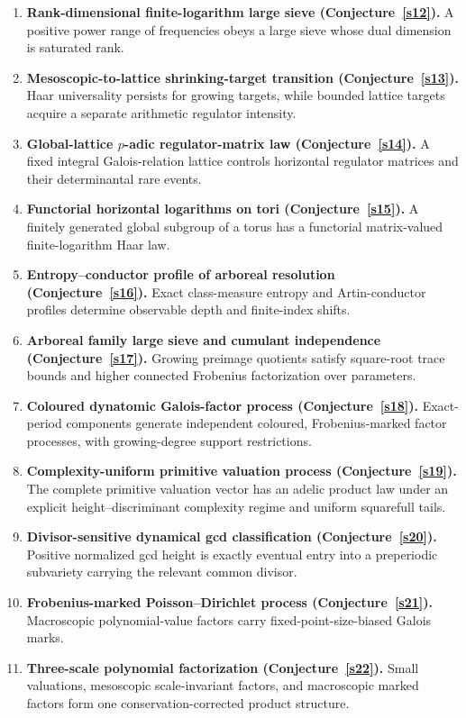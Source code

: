 \documentclass[11pt]{article}
\theoremstyle{definition}
\begin{document}
\begin{enumerate}
\item \textbf{Rank-dimensional finite-logarithm large sieve (Conjecture~\ref{s12}).}  A positive power range of frequencies obeys a large sieve whose dual dimension is saturated rank.
\item \textbf{Mesoscopic-to-lattice shrinking-target transition (Conjecture~\ref{s13}).}  Haar universality persists for growing targets, while bounded lattice targets acquire a separate arithmetic regulator intensity.
\item \textbf{Global-lattice $p$-adic regulator-matrix law (Conjecture~\ref{s14}).}  A fixed integral Galois-relation lattice controls horizontal regulator matrices and their determinantal rare events.
\item \textbf{Functorial horizontal logarithms on tori (Conjecture~\ref{s15}).}  A finitely generated global subgroup of a torus has a functorial matrix-valued finite-logarithm Haar law.
\item \textbf{Entropy--conductor profile of arboreal resolution (Conjecture~\ref{s16}).}  Exact class-measure entropy and Artin-conductor profiles determine observable depth and finite-index shifts.
\item \textbf{Arboreal family large sieve and cumulant independence (Conjecture~\ref{s17}).}  Growing preimage quotients satisfy square-root trace bounds and higher connected Frobenius factorization over parameters.
\item \textbf{Coloured dynatomic Galois-factor process (Conjecture~\ref{s18}).}  Exact-period components generate independent coloured, Frobenius-marked factor processes, with growing-degree support restrictions.
\item \textbf{Complexity-uniform primitive valuation process (Conjecture~\ref{s19}).}  The complete primitive valuation vector has an adelic product law under an explicit height--discriminant complexity regime and uniform squarefull tails.
\item \textbf{Divisor-sensitive dynamical gcd classification (Conjecture~\ref{s20}).}  Positive normalized gcd height is exactly eventual entry into a preperiodic subvariety carrying the relevant common divisor.
\item \textbf{Frobenius-marked Poisson--Dirichlet process (Conjecture~\ref{s21}).}  Macroscopic polynomial-value factors carry fixed-point-size-biased Galois marks.
\item \textbf{Three-scale polynomial factorization (Conjecture~\ref{s22}).}  Small valuations, mesoscopic scale-invariant factors, and macroscopic marked factors form one conservation-corrected product structure.

\end{enumerate}
\end{document}
